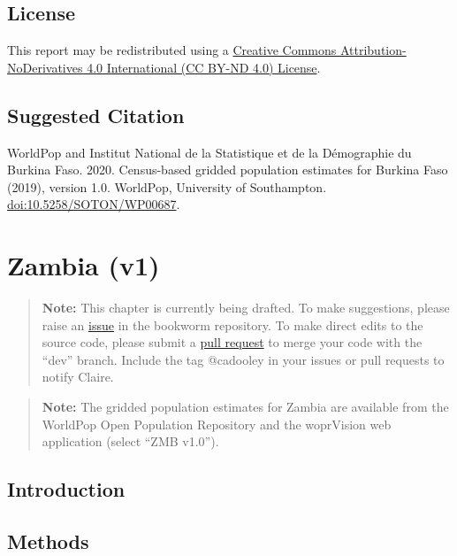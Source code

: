 \documentclass[]{book}
\begin{document}
\section*{License}\label{license-4}

This report may be redistributed using a
\href{https://creativecommons.org/licenses/by-nd/4.0/}{Creative Commons
Attribution-NoDerivatives 4.0 International (CC BY-ND 4.0) License}.

\section*{Suggested Citation}\label{suggested-citation-6}

WorldPop and Institut National de la Statistique et de la Démographie du
Burkina Faso. 2020. Census-based gridded population estimates for
Burkina Faso (2019), version 1.0. WorldPop, University of Southampton.
\url{doi:10.5258/SOTON/WP00687}.

\chapter{Zambia (v1)}\label{zambia-v1}

\begin{quote}
\textbf{Note:} This chapter is currently being drafted. To make
suggestions, please raise an
\href{https://github.com/wpgp/bookworm/issues}{issue} in the bookworm
repository. To make direct edits to the source code, please submit a
\href{https://github.com/wpgp/bookworm/pulls}{pull request} to merge
your code with the ``dev'' branch. Include the tag @cadooley in your
issues or pull requests to notify Claire.
\end{quote}

\begin{quote}
\textbf{Note:} The gridded population estimates for Zambia are available
from the WorldPop Open Population Repository and the woprVision web
application (select ``ZMB v1.0'').
\end{quote}

\section{Introduction}\label{introduction-3}

\section{Methods}\label{methods-1}
\end{document}
